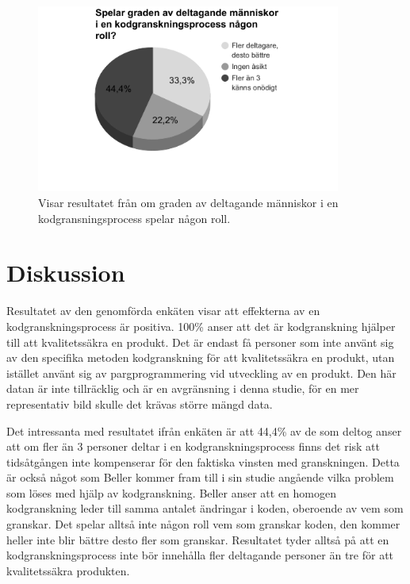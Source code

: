 \begin{figure}[H]
	\centering
	\includegraphics[width=100mm]{figures/grade_participation.png}
	\caption{Visar resultatet från om graden av deltagande människor i en kodgransningsprocess spelar någon roll.}
	\label{fig:grade_participation}
\end{figure}

\section{Diskussion}
\label{sec:discussion-wallstrom}
Resultatet av den genomförda enkäten visar att effekterna av en kodgranskningsprocess är positiva. 100\% anser att det är kodgranskning hjälper till att kvalitetssäkra en produkt. Det är endast få personer som inte använt sig av den specifika metoden kodgranskning för att kvalitetssäkra en produkt, utan istället använt sig av pargprogrammering vid utveckling av en produkt. Den här datan är inte tillräcklig och är en avgränsning i denna studie, för en mer representativ bild skulle det krävas större mängd data. 

Det intressanta med resultatet ifrån enkäten är att 44,4\% av de som deltog anser att om fler än 3 personer deltar i en kodgranskningsprocess finns det risk att tidsåtgången inte kompenserar för den faktiska vinsten med granskningen. Detta är också något som Beller \cite{beller2014modern} kommer fram till i sin studie angående vilka problem som löses med hjälp av kodgranskning. Beller anser att en homogen kodgranskning leder till samma antalet ändringar i koden, oberoende av vem som granskar. Det spelar alltså inte någon roll vem som granskar koden, den kommer heller inte blir bättre desto fler som granskar. Resultatet tyder alltså på att en kodgranskningsprocess inte bör innehålla fler deltagande personer än tre för att kvalitetssäkra produkten. 

